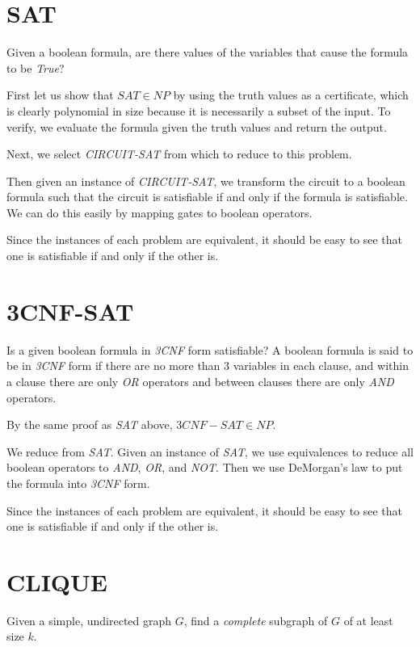 \section{SAT}

Given a boolean formula, are there values of the variables that cause
the formula to be \emph{True}?

First let us show that $SAT \in NP$ by using the truth values as a
certificate, which is clearly polynomial in size because it is
necessarily a subset of the input.  To verify, we evaluate the formula
given the truth values and return the output.

Next, we select \emph{CIRCUIT-SAT} from which to reduce to this
problem.

Then given an instance of \emph{CIRCUIT-SAT}, we transform the circuit
to a boolean formula such that the circuit is satisfiable if and only
if the formula is satisfiable.  We can do this easily by mapping gates
to boolean operators.

Since the instances of each problem are equivalent, it should be easy
to see that one is satisfiable if and only if the other is.

\section{3CNF-SAT}

Is a given boolean formula in \emph{3CNF} form satisfiable?  A boolean
formula is said to be in \emph{3CNF} form if there are no more than
$3$ variables in each clause, and within a clause there are only
\emph{OR} operators and between clauses there are only \emph{AND}
operators.

By the same proof as \emph{SAT} above, $3CNF-SAT \in NP$.

We reduce from \emph{SAT}.  Given an instance of \emph{SAT}, we use
equivalences to reduce all boolean operators to \emph{AND}, \emph{OR},
and \emph{NOT}.  Then we use DeMorgan's law to put the formula into
\emph{3CNF} form.

Since the instances of each problem are equivalent, it should be easy
to see that one is satisfiable if and only if the other is.

\section{CLIQUE}

Given a simple, undirected graph $G$, find a \emph{complete} subgraph
of $G$ of at least size $k$.

